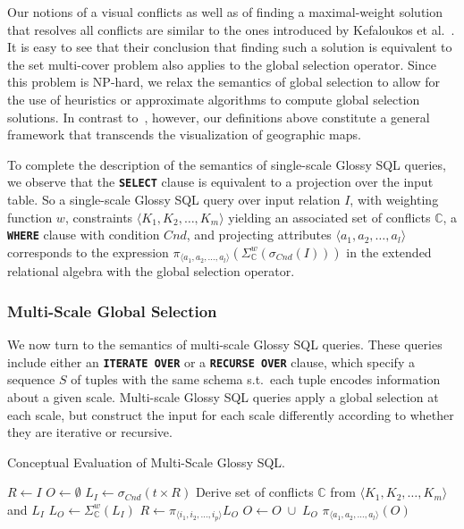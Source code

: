 \documentclass[11pt, oneside]{report}
\begin{document}
Our notions of a visual conflicts as well as of finding a maximal-weight solution that resolves all conflicts are similar to the ones introduced by Kefaloukos et al.~\cite{KefaloukosSZ14:CVL}. It is easy to see that their conclusion that finding such a solution is equivalent to the set multi-cover problem also applies to the global selection operator. Since this problem is NP-hard, we relax the semantics of global selection to allow for the use of heuristics or approximate algorithms to compute global selection solutions. In contrast to~\cite{KefaloukosSZ14:CVL}, however, our definitions above constitute a general framework that transcends the visualization of geographic maps.     

To complete the description of the semantics of single-scale Glossy SQL queries, we observe that the \textbf{\texttt{SELECT}} clause is equivalent to a projection over the input table. So a single-scale Glossy SQL query over input relation $I$, with weighting function $w$, constraints $\langle K_1, K_2, \ldots, K_m\rangle$ yielding an associated set of conflicts $\mathbb{C}$, a \textbf{\texttt{WHERE}} clause with condition $Cnd$, and projecting attributes $\langle a_1, a_2, \ldots, a_l \rangle$ corresponds to the expression $\pi_{\langle a_1, a_2, \ldots, a_l \rangle} (\Sigma_{\mathbb{C}}^{w}(\sigma_{Cnd}(I)))$ in the extended relational algebra with the global selection operator. 
 
\subsubsection{Multi-Scale Global Selection}
\label{sec:semantics:multiscale}

We now turn to the semantics of multi-scale Glossy SQL queries. These queries include either an \textbf{\texttt{ITERATE OVER}} or a \textbf{\texttt{RECURSE OVER}} clause, which specify a sequence $S$ of tuples with the same schema s.t.~each tuple encodes information about a given scale. Multi-scale Glossy SQL queries apply a global selection at each scale, but construct the input for each scale differently according to whether they are iterative or recursive.

\begin{algorithm}
\caption{Conceptual Evaluation of Multi-Scale Glossy SQL.}
\begin{algorithmic}
\STATE $R \leftarrow I$
\STATE $O \leftarrow \emptyset$
\STATE $L_I \leftarrow \sigma_{Cnd}(t \times R)$
\STATE Derive set of conflicts $\mathbb{C}$ from $\langle K_1, K_2, \ldots, K_m\rangle$ and $L_I$
\STATE $L_O \leftarrow \Sigma_{\mathbb{C}}^{w}(L_I)$ 
\STATE $R \leftarrow \pi_{\langle i_1, i_2, \ldots, i_p \rangle} L_O$ 
\ENDIF
\STATE $O \leftarrow O \; \cup \; L_O$
\ENDFOR
\RETURN $\pi_{\langle a_1, a_2, \ldots, a_l \rangle} (O)$
\end{algorithmic}
\label{alg:conceptual:multiscale}
\end{algorithm}
\end{document}
